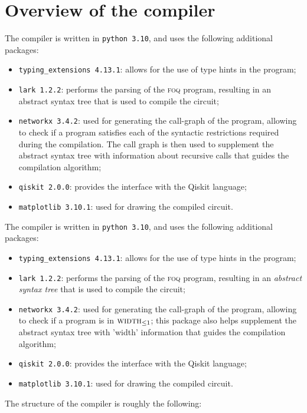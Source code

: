 \documentclass[a4paper,onecolumn,11pt,unpublished]{quantumarticle}
\newcommand{\foq}{\textnormal{\textsc{foq}}}
\newcommand{\wi}{\textnormal{\textsc{width}}}
\begin{document}
\section{Overview of the compiler}


The compiler is written in \texttt{python 3.10}, and uses the following additional packages:
\begin{itemize}
\item \texttt{typing\_extensions 4.13.1}: allows for the use of type hints in the program;
\item \texttt{lark 1.2.2}: performs the parsing of the \foq{} program, resulting in an abstract syntax tree that is used to compile the circuit;
\item \texttt{networkx 3.4.2}: used for generating the call-graph of the program, allowing to check if a program satisfies each of the syntactic restrictions required during the compilation. The call graph is then used to supplement the abstract syntax tree with information about recursive calls that guides the compilation algorithm;
\item \texttt{qiskit 2.0.0}: provides the interface with the Qiskit language;
\item \texttt{matplotlib 3.10.1}: used for drawing the compiled circuit.
\end{itemize}


The compiler is written in \texttt{python 3.10}, and uses the following additional packages:
\begin{itemize}
\item \texttt{typing\_extensions 4.13.1}: allows for the use of type hints in the program;
\item \texttt{lark 1.2.2}: performs the parsing of the \foq{} program, resulting in an \emph{abstract syntax tree} that is used to compile the circuit;
\item \texttt{networkx 3.4.2}: used for generating the call-graph of the program, allowing to check if a program is in $\wi_{\leq 1}$; this package also helps supplement the abstract syntax tree with 'width' information that guides the compilation algorithm;
\item \texttt{qiskit 2.0.0}: provides the interface with the Qiskit language;
\item \texttt{matplotlib 3.10.1}: used for drawing the compiled circuit.
\end{itemize}

The structure of the compiler is roughly the following:
\vspace{3mm}
\end{document}
